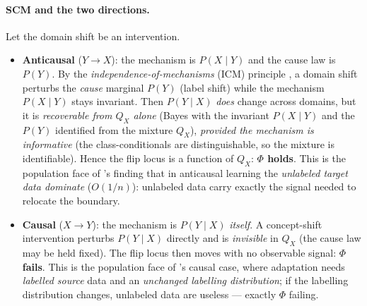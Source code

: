 \paragraph{SCM and the two directions.} Let the domain shift be an intervention.
\begin{itemize}\itemsep2pt
\item \textbf{Anticausal} ($Y\to X$): the mechanism is $P(X\mid Y)$ and the cause law
is $P(Y)$. By the \emph{independence-of-mechanisms} (ICM) principle
\citep{scholkopf2012causal}, a domain shift perturbs the \emph{cause} marginal $P(Y)$
(label shift) while the mechanism $P(X\mid Y)$ stays invariant. Then $P(Y\mid X)$
\emph{does} change across domains, but it is \emph{recoverable from $Q_X$ alone}
(Bayes with the invariant $P(X\mid Y)$ and the $P(Y)$ identified from the mixture
$Q_X$), \emph{provided the mechanism is informative} (the class-conditionals are
distinguishable, so the mixture is identifiable). Hence the flip locus is a function of
$Q_X$: \textbf{$\Phi$ holds}. This is the population face of \citet{wu2024causality}'s
finding that in anticausal learning the \emph{unlabeled target data dominate}
($O(1/n)$): unlabeled data carry exactly the signal needed to relocate the boundary.
\item \textbf{Causal} ($X\to Y$): the mechanism is $P(Y\mid X)$ \emph{itself}. A
concept-shift intervention perturbs $P(Y\mid X)$ directly and is \emph{invisible} in
$Q_X$ (the cause law may be held fixed). The flip locus then moves with no observable
signal: \textbf{$\Phi$ fails}. This is the population face of
\citet{wu2024causality}'s causal case, where adaptation needs \emph{labelled source}
data and an \emph{unchanged labelling distribution}; if the labelling distribution
changes, unlabeled data are useless --- exactly $\Phi$ failing.
\end{itemize}

